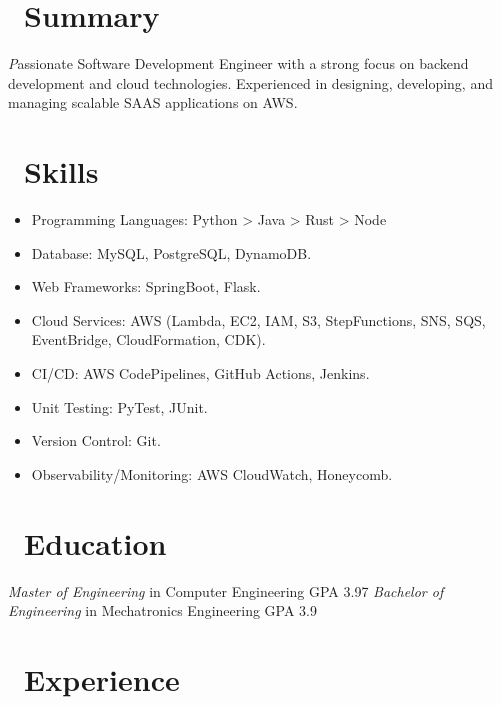 \documentclass{resume}
\begin{document}



\section{\faChild\ Summary}
\textit Passionate Software Development Engineer with a strong focus on backend development and cloud technologies. Experienced in designing, developing, and managing scalable SAAS applications on AWS.

\section{\faCogs\ Skills}
\begin{itemize}[parsep=0.5ex]
  \item Programming Languages: Python > Java > Rust > Node
  \item Database: MySQL, PostgreSQL, DynamoDB.
  \item Web Frameworks: SpringBoot, Flask.
  \item Cloud Services: AWS (Lambda, EC2, IAM, S3, StepFunctions, SNS, SQS, EventBridge, CloudFormation, CDK).
  \item CI/CD: AWS CodePipelines, GitHub Actions, Jenkins.
  \item Unit Testing: PyTest, JUnit.
  \item Version Control: Git.
  \item Observability/Monitoring: AWS CloudWatch, Honeycomb.
\end{itemize}

\section{\faGraduationCap\ Education}
\textit{Master of Engineering} in Computer Engineering GPA 3.97
\textit{Bachelor of Engineering} in Mechatronics Engineering GPA 3.9

\section{\faUsers\ Experience}
\end{document}
